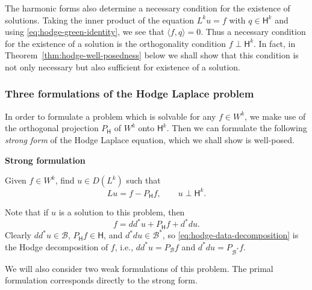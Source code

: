 {The harmonic forms also determine a necessary condition for the existence of solutions. Taking the inner product of the equation $L^k u=f$ with $q\in\mathsf H^k$ and using \eqref{eq:hodge-green-identity}, we see that $\langle f,q\rangle=0$. Thus a necessary condition for the existence of a solution is the orthogonality condition $f\perp\mathsf H^k$. In fact, in Theorem~\ref{thm:hodge-well-posedness} below we shall show that this condition is not only necessary but also sufficient for existence of a solution.}

\subsubsection{{Three formulations of the Hodge Laplace problem}}\label{subsec:hodge-three-formulations}

{In order to formulate a problem which is solvable for any $f\in W^k$, we make use of the orthogonal projection $P_{\mathsf H}$ of $W^k$ onto $\mathsf H^k$. Then we can formulate the following \emph{strong form} of the Hodge Laplace equation, which we shall show is well-posed.}

\medskip\noindent\textbf{{Strong formulation}}\par
{Given $f\in W^k$, find $u\in D(L^k)$ such that}
\begin{equation}\label{eq:hodge-strong-formulation}
Lu=f-P_{\mathsf H}f,\qquad u\perp\mathsf H^k.
\end{equation}

{Note that if $u$ is a solution to this problem, then}
\begin{equation}\label{eq:hodge-data-decomposition}
f=dd^*u+P_{\mathsf H}f+d^*du.
\end{equation}
{Clearly $dd^*u\in\mathcal B$, $P_{\mathsf H}f\in\mathsf H$, and $d^*du\in\mathcal B^*$, so \eqref{eq:hodge-data-decomposition} is the Hodge decomposition of $f$, i.e., $dd^*u=P_{\mathcal B}f$ and $d^*du=P_{\mathcal B^*}f$.}

{We will also consider two weak formulations of this problem. The primal formulation corresponds directly to the strong form.}


